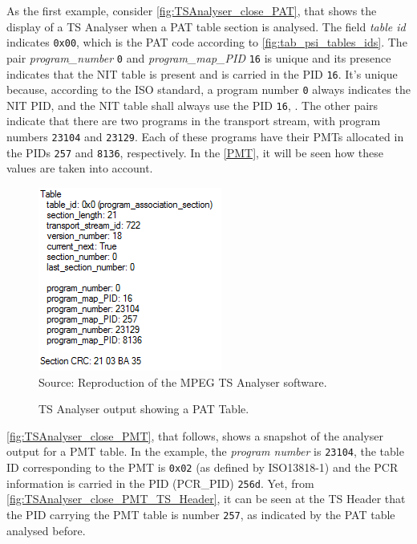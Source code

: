 \documentclass[
	12pt,				%
	openright,			%
	twoside,			%
	a4paper,			%
	brazil,
	french,				%
	english
	]{abntex2}
\begin{document}
\begin{apendicesenv}
As the first example, consider \autoref{fig:TSAnalyser_close_PAT}, that shows the display of a TS Analyser when a PAT table section is analysed. The field \textit{table id} indicates \texttt{0x00}, which is the PAT code according to \autoref{fig:tab_psi_tables_ids}. The pair \textit{program\hspace{0.1mm}\_\hspace{0.1mm}number} \texttt{0} and \textit{program\hspace{0.1mm}\_\hspace{0.1mm}map\hspace{0.1mm}\_\hspace{0.1mm}PID} \texttt{16} is unique and its presence indicates that the NIT table is present and is carried in the PID \texttt{16}. It's unique because, according to the ISO standard, a program number \texttt{0} always indicates the NIT PID, and the NIT table shall always use the PID \texttt{16}, . The other pairs indicate that there are two programs in the transport stream, with program numbers \texttt{23104} and \texttt{23129}. Each of these programs have their PMTs allocated in the PIDs \texttt{257} and \texttt{8136}, respectively. In the \autoref{PMT}, it will be seen how these values are taken into account.

\begin{figure}[!hb]
\centering
\caption{TS Analyser output showing a PAT Table.}
\includegraphics[width=0.4\linewidth]{figuras/TSAnalyser_close_PAT.png}
\\Source: Reproduction of the MPEG TS Analyser software.
\label{fig:TSAnalyser_close_PAT}
\end{figure}

\autoref{fig:TSAnalyser_close_PMT}, that follows, shows a snapshot of the analyser output for a PMT table. In the example, the \textit{program number} is \texttt{23104}, the table ID corresponding to the PMT is \texttt{0x02} (as defined by ISO13818-1) and the PCR information is carried in the PID (PCR\hspace{0.1mm}\_\hspace{0.1mm}PID) \texttt{256d}. Yet, from \autoref{fig:TSAnalyser_close_PMT_TS_Header}, it can be seen at the TS Header that the PID carrying the PMT table is number \texttt{257}, as indicated by the PAT table analysed before.


\end{apendicesenv}
\end{document}
